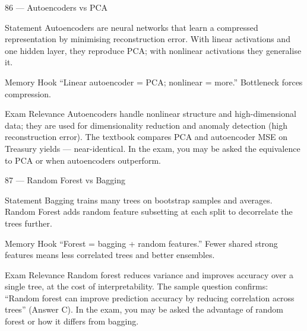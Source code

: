 \documentclass[aspectratio=169,8pt]{beamer}
\begin{document}
	\begin{frame}{86 --- Autoencoders vs PCA}
		\begin{block}{Statement}
			Autoencoders are neural networks that learn a compressed representation by minimising reconstruction error. With linear activations and one hidden layer, they reproduce PCA; with nonlinear activations they generalise it.
		\end{block}
		\begin{block}{Memory Hook}
			``Linear autoencoder = PCA; nonlinear = more.'' Bottleneck forces compression.
		\end{block}
		\begin{block}{Exam Relevance}
			Autoencoders handle nonlinear structure and high-dimensional data; they are used for dimensionality reduction and anomaly detection (high reconstruction error). The textbook compares PCA and autoencoder MSE on Treasury yields --- near-identical. In the exam, you may be asked the equivalence to PCA or when autoencoders outperform.
		\end{block}
	\end{frame}
	
	\begin{frame}{87 --- Random Forest vs Bagging}
		\begin{block}{Statement}
			Bagging trains many trees on bootstrap samples and averages. Random Forest adds random feature subsetting at each split to decorrelate the trees further.
		\end{block}
		\begin{block}{Memory Hook}
			``Forest = bagging + random features.'' Fewer shared strong features means less correlated trees and better ensembles.
		\end{block}
		\begin{block}{Exam Relevance}
			Random forest reduces variance and improves accuracy over a single tree, at the cost of interpretability. The sample question confirms: ``Random forest can improve prediction accuracy by reducing correlation across trees'' (Answer C). In the exam, you may be asked the advantage of random forest or how it differs from bagging.
		\end{block}
	\end{frame}
	
\end{document}

